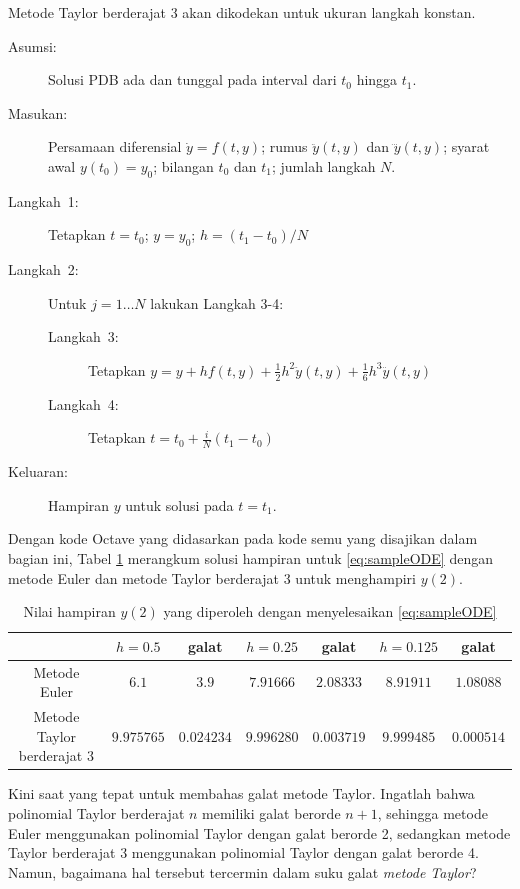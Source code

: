Metode Taylor berderajat 3 akan dikodekan untuk ukuran langkah konstan.

\begin{pseudocode} 
\begin{description}
\item [{Asumsi:}] Solusi PDB ada dan tunggal pada interval dari $t_{0}$
hingga $t_{1}$.
\item [{Masukan:}] Persamaan diferensial $\dot{y}=f(t,y)$; rumus $\ddot{y}(t,y)$
dan $\dddot{y}(t,y)$; syarat awal $y(t_{0})=y_{0}$; bilangan $t_{0}$
dan $t_{1}$; jumlah langkah $N$.
\item [{Langkah\ 1:}] Tetapkan $t=t_{0}$; $y=y_{0}$; $h=(t_{1}-t_{0})/N$
\item [{Langkah~2:}] Untuk $j=1\ldots N$ lakukan Langkah 3-4:

\begin{description}
\item [{Langkah~3:}] Tetapkan $y=y+hf(t,y)+\frac{1}{2}h^{2}\ddot{y}(t,y)+\frac{1}{6}h^{3}\dddot{y}(t,y)$
\item [{Langkah~4:}] Tetapkan $t=t_{0}+\frac{i}{N}(t_{1}-t_{0})$
\end{description}
\item [{Keluaran:}] Hampiran $y$ untuk solusi pada $t=t_{1}$.
\end{description}
\end{pseudocode} 

\noindent Dengan kode Octave yang didasarkan pada kode semu yang disajikan
dalam bagian ini, Tabel \ref{tab:taylorApproximatingODE} merangkum
solusi hampiran untuk \ref{eq:sampleODE} dengan metode Euler dan
metode Taylor berderajat 3 untuk menghampiri $y(2)$.
\begin{table}
\caption{\label{tab:taylorApproximatingODE}Nilai hampiran $y(2)$ yang diperoleh
dengan menyelesaikan \ref{eq:sampleODE}}

\centering{}%
\begin{tabular}{c|cc|cc|cc|}
 & \multicolumn{1}{c|}{$h=0.5$} & galat & \multicolumn{1}{c|}{$h=0.25$} & galat & \multicolumn{1}{c|}{$h=0.125$} & galat\tabularnewline
\hline 
Metode Euler & $6.1$ & $3.9$ & $7.91666$ & $2.08333$ & $8.91911$ & $1.08088$\tabularnewline
Metode Taylor berderajat 3  & $9.975765$ & $0.024234$ & $9.996280$ & $0.003719$ & $9.999485$ & $0.000514$\tabularnewline
\end{tabular}
\end{table}

Kini saat yang tepat untuk membahas galat metode Taylor. Ingatlah
bahwa polinomial Taylor berderajat $n$ memiliki galat berorde $n+1$,
sehingga metode Euler menggunakan polinomial Taylor dengan galat berorde
2, sedangkan metode Taylor berderajat 3 menggunakan polinomial Taylor
dengan galat berorde 4. Namun, bagaimana hal tersebut tercermin dalam
suku galat \textit{metode Taylor}? 

